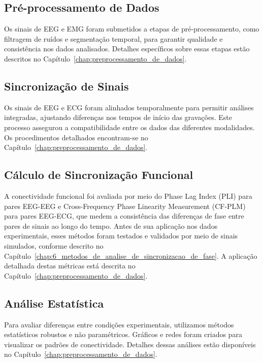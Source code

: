\subsection{Pré-processamento de Dados}
Os sinais de EEG e EMG foram submetidos a etapas de pré-processamento, como filtragem de ruídos e segmentação temporal, para garantir qualidade e consistência nos dados analisados. Detalhes específicos sobre essas etapas estão descritos no Capítulo~\ref{chap:preprocessamento_de_dados}.

\subsection{Sincronização de Sinais}
Os sinais de EEG e ECG foram alinhados temporalmente para permitir análises integradas, ajustando diferenças nos tempos de início das gravações. Este processo assegurou a compatibilidade entre os dados das diferentes modalidades. Os procedimentos detalhados encontram-se no Capítulo~\ref{chap:preprocessamento_de_dados}.

\subsection{Cálculo de Sincronização Funcional}
A conectividade funcional foi avaliada por meio do Phase Lag Index (PLI) para pares EEG-EEG e Cross-Frequency Phase Linearity Measurement (CF-PLM) para pares EEG-ECG, que medem a consistência das diferenças de fase entre pares de sinais ao longo do tempo. Antes de sua aplicação nos dados experimentais, esses métodos foram testados e validados por meio de sinais simulados, conforme descrito no Capítulo~\ref{chap:6_metodos_de_analise_de_sincronizacao_de_fase}. A aplicação detalhada destas métricas está descrita no Capítulo~\ref{chap:preprocessamento_de_dados}.

\subsection{Análise Estatística}
Para avaliar diferenças entre condições experimentais, utilizamos métodos estatísticos robustos e não paramétricos. Gráficos e redes foram criados para visualizar os padrões de conectividade. Detalhes dessas análises estão disponíveis no Capítulo~\ref{chap:preprocessamento_de_dados}.
